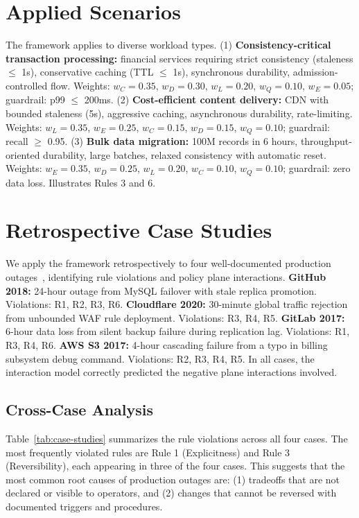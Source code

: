 \documentclass[conference]{IEEEtran}
\begin{document}
{{\section{Applied Scenarios}
\label{sec:scenarios}
The framework applies to diverse workload types. (1) \textbf{Consistency-critical transaction processing:} financial services requiring strict consistency (staleness $\leq$ 1s), conservative caching (TTL $\leq$ 1s), synchronous durability, admission-controlled flow. Weights: $w_C=0.35$, $w_D=0.30$, $w_L=0.20$, $w_Q=0.10$, $w_E=0.05$; guardrail: p99 $\leq$ 200ms. (2) \textbf{Cost-efficient content delivery:} CDN with bounded staleness (5s), aggressive caching, asynchronous durability, rate-limiting. Weights: $w_L=0.35$, $w_E=0.25$, $w_C=0.15$, $w_D=0.15$, $w_Q=0.10$; guardrail: recall $\geq$ 0.95. (3) \textbf{Bulk data migration:} 100M records in 6 hours, throughput-oriented durability, large batches, relaxed consistency with automatic reset. Weights: $w_E=0.35$, $w_D=0.25$, $w_L=0.20$, $w_C=0.10$, $w_Q=0.10$; guardrail: zero data loss. Illustrates Rules 3 and 6.

\section{Retrospective Case Studies}
\label{sec:cases}

We apply the framework retrospectively to four well-documented production outages~\cite{github2018,cloudflare2020,gitlab2017,aws2017}, identifying rule violations and policy plane interactions. \textbf{GitHub 2018:} 24-hour outage from MySQL failover with stale replica promotion. Violations: R1, R2, R3, R6. \textbf{Cloudflare 2020:} 30-minute global traffic rejection from unbounded WAF rule deployment. Violations: R3, R4, R5. \textbf{GitLab 2017:} 6-hour data loss from silent backup failure during replication lag. Violations: R1, R3, R4, R6. \textbf{AWS S3 2017:} 4-hour cascading failure from a typo in billing subsystem debug command. Violations: R2, R3, R4, R5. In all cases, the interaction model correctly predicted the negative plane interactions involved.}

\subsection{Cross-Case Analysis}

Table~\ref{tab:case-studies} summarizes the rule violations across all four cases. The most frequently violated rules are Rule 1 (Explicitness) and Rule 3 (Reversibility), each appearing in three of the four cases. This suggests that the most common root causes of production outages are: (1) tradeoffs that are not declared or visible to operators, and (2) changes that cannot be reversed with documented triggers and procedures.

}
\end{document}
